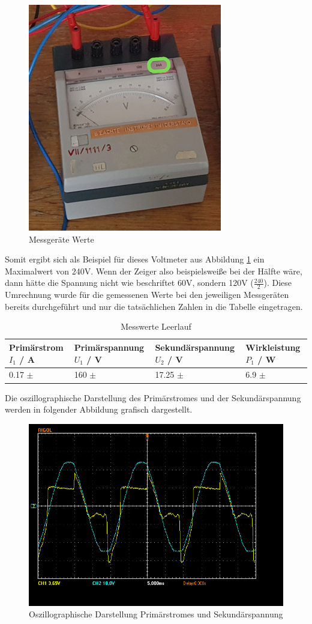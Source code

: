 \documentclass[12pt,a4paper,twoside]{article}
\begin{document}
\begin{figure}[H]
    \centering
    \includegraphics[width=0.4\linewidth, angle=0]{nudes/VoltmeterBeschriftung.png}
    \caption{Messgeräte Werte}
    \label{fig:MessgerätWerte}
\end{figure}

\noindent
Somit ergibt sich als Beispiel für dieses Voltmeter aus Abbildung \ref{fig:MessgerätWerte} ein Maximalwert von 240V. Wenn der Zeiger also beispielsweiße bei der Hälfte wäre, dann hätte die Spannung nicht wie beschriftet 60V, sondern 120V ($\frac{240}{2}$). Diese Umrechnung wurde für die gemessenen Werte bei den jeweiligen Messgeräten bereits durchgeführt und nur die tatsächlichen Zahlen in die Tabelle eingetragen.

\begin{table}[H]
    \centering
    \caption{Messwerte Leerlauf}
    \label{tab:messwerteLeerlauf}
    \begin{tabular}{| l | l | l | l |}
        \hline
        Primärstrom $I_{1}$ / A  & Primärspannung $U_{1}$ / V & Sekundärspannung $U_{2}$ / V & Wirkleistung $P_{1}$ / W \\
        \hline
        0.17 $\pm$  & 160 $\pm$  & 17.25 $\pm$  & 6.9 $\pm$  \\
        \hline
    \end{tabular}
\end{table}

\noindent
Die oszillographische Darstellung des Primärstromes und der Sekundärspannung werden in folgender Abbildung grafisch dargestellt.

\begin{figure}[H]
    \centering
    \includegraphics[width=0.6\linewidth, angle=0]{nudes/A1 Oszi.jpg}
    \caption{Oszillographische Darstellung Primärstromes und Sekundärspannung}
    \label{fig:OszilloskopA}
\end{figure}
\end{document}
